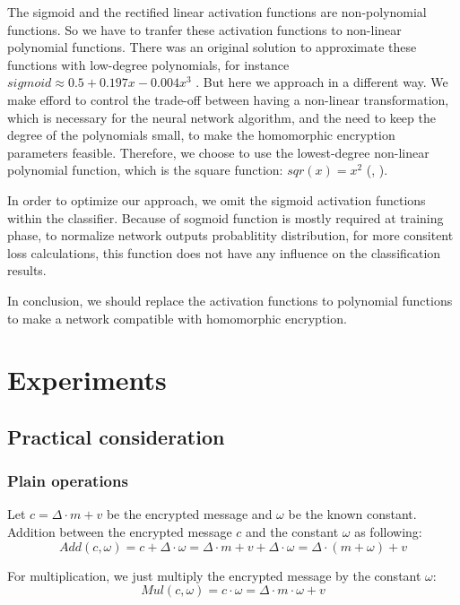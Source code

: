 \documentclass[A4paper,12pt]{article}
\begin{document}
The sigmoid and the rectified linear activation functions are non-polynomial functions. So we have to tranfer these activation functions to non-linear polynomial functions. There was an original solution to approximate these functions with low-degree polynomials, for instance $sigmoid \approx 0.5 + 0.197x - 0.004x^3$ \cite{appro_sigmoid}. But here we approach in a different way. We make efford to control the trade-off between having a non-linear transformation, which is necessary for the neural network algorithm, and the need to keep the degree of the polynomials small, to make the homomorphic encryption parameters feasible. Therefore, we choose to use the lowest-degree non-linear polynomial function, which is the square function: $sqr(x) = x^2$ (\cite{replace_relu}, \cite{replace_activate}).

In order to optimize our approach, we omit the sigmoid activation functions within the classifier. Because of sogmoid function is mostly required at training phase, to normalize network outputs probablitity distribution, for more consitent loss calculations, this function does not have any influence on the classification results.

In conclusion, we should replace the activation functions to polynomial functions to make a network compatible with homomorphic encryption.

\section{Experiments}
\subsection{Practical consideration}

	\subsubsection{Plain operations}
	
Let $c = \Delta \cdot m + v$ be the encrypted message and $\omega$ be the known constant. Addition between the encrypted message $c$ and the constant $\omega$ as following: 
\begin{equation*}
	Add(c, \omega) = c + \Delta \cdot \omega = \Delta \cdot m + v + \Delta \cdot \omega = \Delta \cdot (m + \omega) + v
\end{equation*}

For multiplication, we just multiply the encrypted message by the constant $\omega$:
\begin{equation*}
	Mul(c, \omega) = c \cdot \omega = \Delta \cdot m \cdot \omega + v
\end{equation*}
\end{document}
